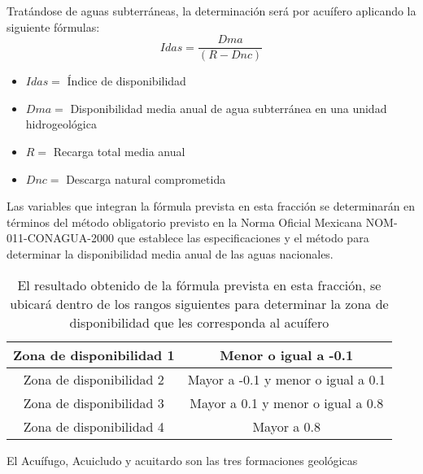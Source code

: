 Tratándose de aguas subterráneas, la determinación será por acuífero aplicando la siguiente fórmulas:
\begin{equation}
Idas=\frac{Dma}{(R-Dnc)}
\end{equation}
\begin{notation}
    \begin{itemize}
        \item $Idas=$ Índice de disponibilidad
        \item $Dma=$ Disponibilidad media anual de agua subterránea en una unidad hidrogeológica
        \item $R=$ Recarga total media anual
        \item $Dnc=$ Descarga natural comprometida
    \end{itemize}
\end{notation}
Las variables que integran la fórmula prevista en esta fracción se determinarán en términos del método obligatorio previsto en la Norma Oficial Mexicana NOM-011-CONAGUA-2000 que establece las especificaciones y el método para determinar la disponibilidad media anual de las aguas nacionales.
\begin{table}[h!]
    \centering
    \begin{tabular}{@{}cc@{}}
    \toprule
    Zona de disponibilidad 1 & Menor o igual a -0.1               \\ \midrule
    Zona de disponibilidad 2 & Mayor a -0.1 y menor o igual a 0.1 \\
    Zona de disponibilidad 3 & Mayor a 0.1 y menor o igual a 0.8  \\
    Zona de disponibilidad 4 & Mayor a 0.8                        \\ \bottomrule
    \end{tabular}
    \caption{El resultado obtenido de la fórmula prevista en esta fracción, se ubicará dentro de los rangos siguientes para determinar la zona de disponibilidad que les corresponda al acuífero}
    \label{tabgh3}
\end{table}
El Acuífugo, Acuicludo y acuitardo son las tres formaciones geológicas

